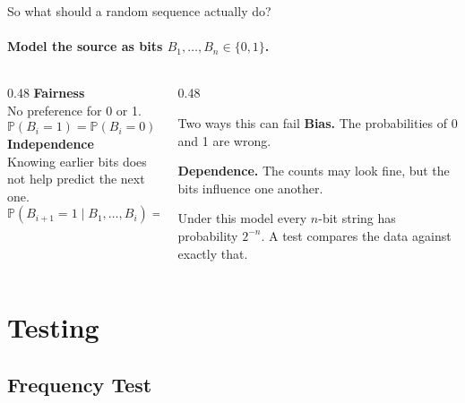 \documentclass[11pt,aspectratio=169]{beamer}
\newcommand{\Prob}[1]{\mathbb{P}\!\left(#1\right)}
\newcommand{\bits}{\{0,1\}}
\begin{document}
\begin{frame}{So what should a random sequence actually do?}
  \framesubtitle{Model the source as bits $B_1,\ldots,B_n\in\bits$.}
  \begin{columns}[T]
    \begin{column}{0.48\textwidth}
      \textbf{\color{deep}Fairness}\\
      No preference for 0 or 1.
      \[\Prob{B_i=1}=\Prob{B_i=0}=\tfrac12\]
      \textbf{\color{deep}Independence}\\
      Knowing earlier bits does not help predict the next one.
      \[\Prob{B_{i+1}=1\mid B_1,\ldots,B_i}=\Prob{B_{i+1}=1}\]
    \end{column}
    \begin{column}{0.48\textwidth}
      \begin{block}{Two ways this can fail}
        \textbf{Bias.} The probabilities of 0 and 1 are wrong.

        \medskip
        \textbf{Dependence.} The counts may look fine, but the bits
        influence one another.
      \end{block}
      \medskip
      Under this model every $n$-bit string has probability $2^{-n}$.
      A test compares the data against exactly that.
    \end{column}
  \end{columns}
\end{frame}

\section{Testing}
\subsection{Frequency Test}
\end{document}
